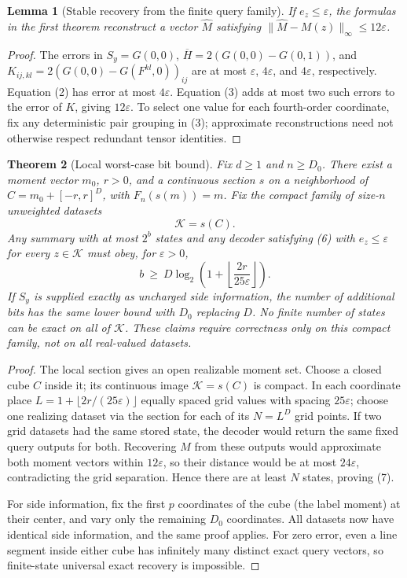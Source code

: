 \documentclass[11pt]{article}
\newtheorem{theorem}{Theorem}
\newtheorem{lemma}[theorem]{Lemma}
\begin{document}
\begin{lemma}[Stable recovery from the finite query family]
If $e_z\le\varepsilon$, the formulas in the first theorem reconstruct
a vector $\widehat M$ satisfying
$\|\widehat M-M(z)\|_\infty\le12\varepsilon$.
\end{lemma}
\begin{proof}
The errors in $S_y=G(0,0)$, $\overline H=2(G(0,0)-G(0,1))$,
and $K_{ij,kl}=2(G(0,0)-G(F^{kl},0))_{ij}$ are at most
$\varepsilon$, $4\varepsilon$, and $4\varepsilon$, respectively.
Equation (2) has error at most $4\varepsilon$. Equation (3) adds at
most two such errors to the error of $K$, giving $12\varepsilon$.
To select one value for each fourth-order coordinate, fix any
deterministic pair grouping in (3); approximate reconstructions need
not otherwise respect redundant tensor identities.
\end{proof}

\begin{theorem}[Local worst-case bit bound]
Fix $d\ge1$ and $n\ge D_0$. There exist a moment vector $m_0$,
$r>0$, and a continuous section $s$ on a neighborhood of
$C=m_0+[-r,r]^D$, with $F_n(s(m))=m$. Fix the compact family of
size-$n$ unweighted datasets
\[
 \mathcal K=s(C).
\]
Any summary with at most $2^b$ states and any decoder satisfying
(6) with $e_z\le\varepsilon$ for every $z\in\mathcal K$ must obey,
for $\varepsilon>0$,
\[
 b\ \ge\ D\log_2\left(1+\left\lfloor
                   \frac{2r}{25\varepsilon}\right\rfloor\right).
 \tag{7}
\]
If $S_y$ is supplied exactly as uncharged side information, the
number of additional bits has the same lower bound with $D_0$
replacing $D$. No finite number of states can be exact on all of
$\mathcal K$. These claims require correctness only on this compact
family, not on all real-valued datasets.
\end{theorem}
\begin{proof}
The local section gives an open realizable moment set. Choose a
closed cube $C$ inside it; its continuous image $\mathcal K=s(C)$
is compact. In each coordinate place
$L=1+\lfloor2r/(25\varepsilon)\rfloor$ equally spaced grid values
with spacing $25\varepsilon$; choose one realizing dataset via the
section for each of its $N=L^D$ grid points. If two grid datasets
had the same stored state, the decoder would return the same fixed
query outputs for both. Recovering $M$ from these outputs would
approximate both moment vectors within $12\varepsilon$, so their
distance would be at most $24\varepsilon$, contradicting the grid
separation. Hence there are at least $N$ states, proving (7).

For side information, fix the first $p$ coordinates of the cube
(the label moment) at their center, and vary only the remaining
$D_0$ coordinates. All datasets now have identical side information,
and the same proof applies. For zero error, even a line segment
inside either cube has infinitely many distinct exact query vectors,
so finite-state universal exact recovery is impossible.
\end{proof}
\end{document}

